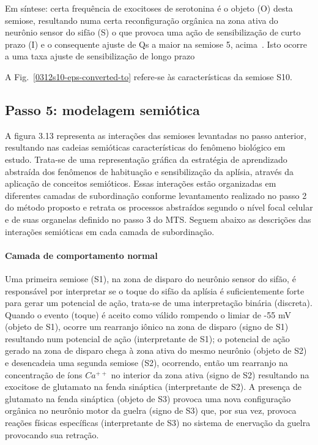 \begin{itemize}
	Em síntese: certa frequência de exocitoses de serotonina
	é o objeto (O) desta semiose, resultando numa certa reconfiguração orgânica na zona ativa do neurônio sensor do sifão (S) o que provoca uma ação de sensibilização de curto prazo (I) e o consequente ajuste de Qs a maior na semiose 5, acima~\cite{kandel06,kandel00}. Isto ocorre a uma taxa ajuste de sensibilização de longo prazo

	A Fig.~\ref{0312s10-eps-converted-to} refere-se às características da semiose S10.

\end{itemize}

\subsection{Passo 5: modelagem semiótica}

A figura 3.13 representa as interações das semioses levantadas no passo anterior, resultando nas cadeias semióticas características do fenômeno biológico em estudo. Trata-se de uma representação gráfica da estratégia de aprendizado abstraída dos fenômenos de habituação e sensibilização da aplísia, através da aplicação de conceitos semióticos. Essas interações estão organizadas em diferentes camadas de subordinação conforme levantamento realizado no passo 2 do método proposto e retrata os processos abstraídos segundo o nível focal celular e de suas organelas definido no passo 3 do MTS. Seguem abaixo as descrições das interações semióticas em cada camada de subordinação.

\paragraph*{Camada de comportamento normal}

Uma primeira semiose (S1), na zona de disparo do neurônio sensor do sifão, é responsável por interpretar se o toque do sifão da aplísia é suficientemente forte para gerar um potencial de ação, trata-se de uma interpretação binária (discreta). Quando o evento (toque) é aceito como válido rompendo o limiar de -55 mV (objeto de S1), ocorre um rearranjo iônico na zona de disparo (signo de S1) resultando num potencial de ação (interpretante de S1); o potencial de ação gerado na zona de disparo chega à zona ativa do mesmo neurônio (objeto de S2) e desencadeia uma segunda semiose (S2), ocorrendo, então um rearranjo na concentração de íons $Ca^{++}$ no interior da zona ativa (signo de S2) resultando na exocitose de glutamato na fenda sináptica (interpretante de S2). A presença de glutamato na fenda sináptica (objeto de S3) provoca uma nova configuração orgânica no neurônio motor da guelra (signo de S3) que, por sua vez, provoca reações físicas específicas (interpretante de S3) no sistema de enervação da guelra provocando sua retração.

